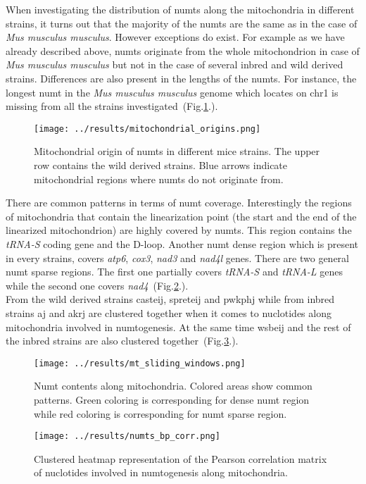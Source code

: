 \documentclass[a4paper,12pt]{article}
\numberwithin{equation}{section} %
\begin{document}
\indent When investigating the distribution of numts along the mitochondria in different strains, it turns out that the majority of the numts are the same as in the case of  \textit{Mus musculus musculus}. However exceptions do exist. For example as we have already described above,  numts originate from the whole mitochondrion in case of  \textit{Mus musculus musculus} but not in the case of several inbred and wild derived strains. Differences are also present in the lengths of the numts. For instance, the longest numt in the \textit{Mus musculus musculus} genome which locates on chr1 is missing from all the strains investigated~(Fig.\ref{fig:mitochondrial_origins}.). 
\begin{figure}[H]
    \centering
    \captionsetup{justification=centering}
    \texttt{[image: ../results/mitochondrial\_origins.png]}
    \caption{Mitochondrial origin of numts in different mice strains. The upper row contains the wild derived strains. Blue arrows indicate mitochondrial regions where numts do not originate from.}
    \label{fig:mitochondrial_origins}
\end{figure}

\indent There are common patterns in terms of  numt coverage. Interestingly the regions of mitochondria that contain the linearization point (the start and the end of the linearized mitochondrion) are highly covered by numts. This region contains the \textit{tRNA-S} coding gene and the D-loop. Another numt dense region which is present in every strains, covers \textit{atp6}, \textit{cox3}, \textit{nad3} and \textit{nad4l} genes. There are two general numt sparse regions. The first one partially covers \textit{tRNA-S} and \textit{tRNA-L} genes while the second one covers \textit{nad4}~(Fig.\ref{fig:mt_sliding_windows}.).\\ \indent From the wild derived strains casteij, spreteij and pwkphj while from inbred strains aj and akrj are clustered together when it comes to nuclotides along mitochondria involved in numtogenesis. At the same time wsbeij and the rest of the inbred strains are also clustered together~(Fig.\ref{fig:numts_bp_corr}.).
\begin{figure}[H]
    \centering
    \captionsetup{justification=centering}
    \texttt{[image: ../results/mt\_sliding\_windows.png]}
    \caption{Numt contents along mitochondria. Colored areas show common patterns. Green coloring is corresponding for dense numt region while red coloring is corresponding for numt sparse region.}
    \label{fig:mt_sliding_windows}
\end{figure}
\begin{figure}[H]
    \centering
    \captionsetup{justification=centering}
    \texttt{[image: ../results/numts\_bp\_corr.png]}
    \caption{Clustered heatmap representation of the Pearson correlation matrix of nuclotides involved in numtogenesis along mitochondria.}
    \label{fig:numts_bp_corr}
\end{figure}
\end{document}
